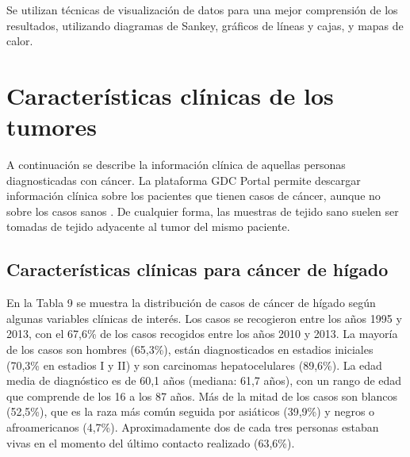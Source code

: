 Se utilizan técnicas de visualización de datos para una mejor comprensión de los resultados, utilizando diagramas de Sankey, gráficos de líneas y cajas, y mapas de calor.

\section{Características clínicas de los tumores}
 
A continuación se describe la información clínica de aquellas personas diagnosticadas con cáncer. La plataforma GDC Portal permite descargar información clínica sobre los pacientes que tienen casos de cáncer, aunque no sobre los casos sanos \cite{GDCPortal}. De cualquier forma, las muestras de tejido sano suelen ser tomadas de tejido adyacente al tumor del mismo paciente.

\subsection{Características clínicas para cáncer de hígado}

En la Tabla 9 se muestra  la distribución de casos de cáncer de hígado según algunas variables clínicas de interés. Los casos se recogieron entre los años 1995 y 2013, con el 67,6\% de los casos recogidos entre los años 2010 y 2013. La mayoría de los casos son hombres (65,3\%), están diagnosticados en estadios iniciales (70,3\% en estadios I y II) y son carcinomas hepatocelulares (89,6\%). La edad media de diagnóstico es de 60,1 años (mediana: 61,7 años), con un rango de edad que comprende de los 16 a los 87 años. Más de la mitad de los casos son blancos (52,5\%), que es la raza más común seguida por asiáticos (39,9\%) y negros o afroamericanos (4,7\%). Aproximadamente dos de cada tres personas estaban vivas en el momento del último contacto realizado (63,6\%).\\

